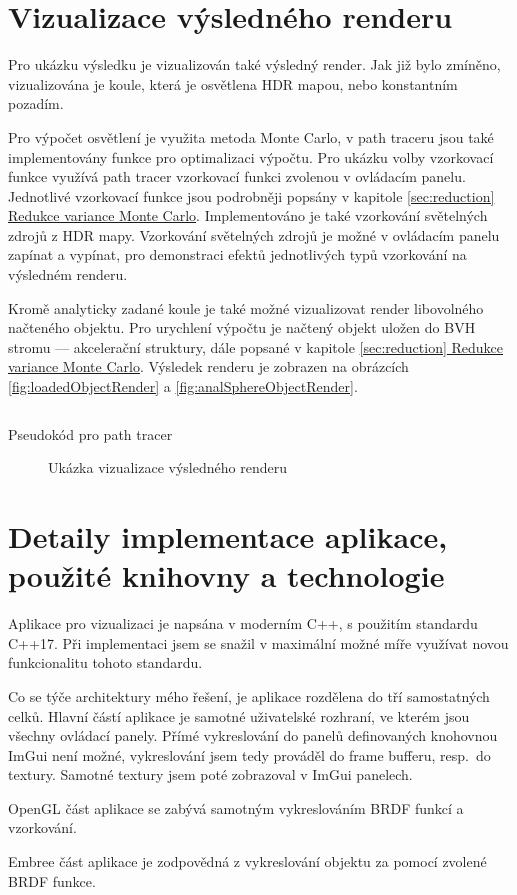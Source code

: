\documentclass[czech,master]{diploma}
\begin{document}
\section{Vizualizace výsledného renderu}
Pro ukázku výsledku je vizualizován také výsledný render. Jak již bylo zmíněno, vizualizována je koule, která je osvětlena HDR mapou, nebo konstantním pozadím. \par
Pro výpočet osvětlení je využita metoda Monte Carlo, v path traceru jsou také implementovány funkce pro optimalizaci výpočtu. Pro ukázku volby vzorkovací funkce využívá path tracer vzorkovací funkci zvolenou v ovládacím panelu. Jednotlivé vzorkovací funkce jsou podrobněji popsány v kapitole \hyperref[sec:reduction]{\ref{sec:reduction} Redukce variance Monte Carlo}. Implementováno je také vzorkování světelných zdrojů z HDR mapy. Vzorkování světelných zdrojů je možné v ovládacím panelu zapínat a vypínat, pro demonstraci efektů jednotlivých typů vzorkování na výsledném renderu. \par
Kromě analyticky zadané koule je také možné vizualizovat render libovolného načteného objektu. Pro urychlení výpočtu je načtený objekt uložen do BVH stromu --- akcelerační struktury, dále popsané v kapitole \hyperref[sec:reduction]{\ref{sec:reduction} Redukce variance Monte Carlo}. Výsledek renderu je zobrazen na obrázcích \hyperref[fig:loadedObjectRender]{\ref{fig:loadedObjectRender}} a \hyperref[fig:analSphereObjectRender]{\ref{fig:analSphereObjectRender}}.

\begin{listing}[ht]
  \inputminted{python}{pathTracer.py}
  \caption{Pseudokód pro path tracer}
  \label{src:pathtracer}
\end{listing}

\begin{figure}[ht]%
  \centering
  \qquad
  \caption{Ukázka vizualizace výsledného renderu}%
  \label{fig:finalrender}%
\end{figure}

\section{Detaily implementace aplikace, použité knihovny a technologie}
Aplikace pro vizualizaci je napsána v moderním C++, s použitím standardu C++17. Při implementaci jsem se snažil v maximální možné míře využívat novou funkcionalitu tohoto standardu. \par
Co se týče architektury mého řešení, je aplikace rozdělena do tří samostatných celků. Hlavní částí aplikace je samotné uživatelské rozhraní, ve kterém jsou všechny ovládací panely. Přímé vykreslování do panelů definovaných knohovnou ImGui není možné, vykreslování jsem tedy prováděl do frame bufferu, resp.\ do textury. Samotné textury jsem poté zobrazoval v ImGui panelech. \par
OpenGL část aplikace se zabývá samotným vykreslováním BRDF funkcí a vzorkování. \par
Embree část aplikace je zodpovědná z vykreslování objektu za pomocí zvolené BRDF funkce.
\end{document}
